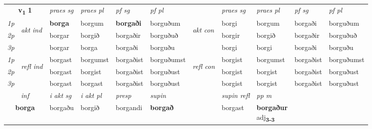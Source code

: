 
\noindent
\begin{tabular}{lllllllllll} \toprule
\multicolumn{2}{c}{\textbf{v{\textsubscript{1}}} \Large{\textbf{1}}}  &  \textit{praes sg}  & \textit{praes pl}  &\textit{ pf sg} & \textit{pf pl} &  &  \textit{praes sg}  & \textit{praes pl}  & \textit{pf sg} & \textit{pf pl } \\*
	\cmidrule{3-6} \cmidrule{8-11}
 {\textit{1p}} & \multirow{3}{*}{\begin{turn}{90}\textit{akt ind}\end{turn}} & \textbf{borga} & borgum & \textbf{borgaði} & borguðum & \multirow{3}{*}{\begin{turn}{90}\textit{akt con}\end{turn}} &borgi & borgum & borgaði & borguðum\\*
 {\textit{2p}} &  &  borgar  & borgið & borgaðir & borguðuð & & borgir & borgið & borgaðir & borguðuð \\*
{\textit{3p}} &  & borgar & borga & borgaði & borguðu & & borgi & borgi& borgaði & borguðu \\*
\cmidrule{3-6} \cmidrule{8-11}
 {\textit{1p}} & \multirow{3}{*}{\begin{turn}{90}\textit{refl ind}\end{turn}}  & borgast & borgumst & borgaðist & borguðumst & \multirow{3}{*}{\begin{turn}{90}\textit{refl con}\end{turn}}  &borgist & borgumst & borgaðist & borguðumst \\*
 {\textit{2p}} &  & borgast & borgist & borgaðist & borguðust & &borgist & borgist & borgaðist & borguðust \\*
 {\textit{3p}}  & & borgast & borgast & borgaðist & borguðust & & borgist & borgist& borgaðist & borguðust \\*
\cmidrule{3-6} \cmidrule{8-11}

   \multicolumn{2}{c}{\textit{inf}}  & \textit{i akt sg} & \textit{i akt pl}   & \textit{presp} & \textit{supin} && \textit{supin refl} & \textit{pp m} \\*
  \multicolumn{2}{c}{\textbf{borga}} & borgaðu  & borgið   & borgandi &  \textbf{borgað} && borgast & \specialcell{\textbf{borgaður} \\ adj\textbf{\textsubscript{3-3}}} \\*
\end{tabular}

